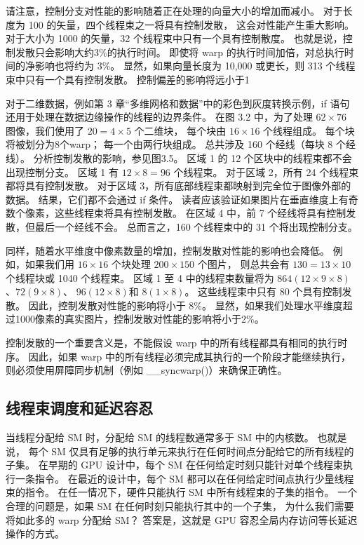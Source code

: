 请注意，控制分支对性能的影响随着正在处理的向量大小的增加而减小。 对于长度为 100 的矢量，四个线程束之一将具有控制发散，
这会对性能产生重大影响。 对于大小为 1000 的矢量，32 个线程束中只有一个具有控制散度。 
也就是说，控制发散只会影响大约3\%的执行时间。 即使将 warp 的执行时间加倍，对总执行时间的净影响也将约为 3\%。 
显然，如果向量长度为 10,000 或更长，则 313 个线程束中只有一个具有控制发散。 控制偏差的影响将远小于1%

对于二维数据，例如第 3 章“多维网格和数据”中的彩色到灰度转换示例，if 语句还用于处理在数据边缘操作的线程的边界条件。 
在图 3.2 中，为了处理 $62 \times 76$ 图像，我们使用了 $20 = 4 \times 5$ 个二维块，
每个块由 $16 \times 16$ 个线程组成。 
每个块将被划分为8个warp； 每一个由两行块组成。 总共涉及 160 个经线（每块 8 个经线）。 分析控制发散的影响，参见图3.5。 
区域 1 的 12 个区块中的线程束都不会出现控制分支。 区域 1 有 $12 \times 8 = 96$ 个线程束。
对于区域 2，所有 24 个线程束都将具有控制发散。 对于区域 3，所有底部线程束都映射到完全位于图像外部的数据。 
结果，它们都不会通过 if 条件。 读者应该验证如果图片在垂直维度上有奇数个像素，这些线程束将具有控制发散。 
在区域 4 中，前 7 个经线将具有控制发散，但最后一个经线不会。 总而言之，160 个线程束中的 31 个将出现控制分支。

同样，随着水平维度中像素数量的增加，控制发散对性能的影响也会降低。 
例如，如果我们用 $16 \times 16$ 个块处理 $200 \times 150$ 个图片，
则总共会有 $130 = 13 \times 10$ 个线程块或 1040 个线程束。 
区域 1 至 4 中的线程束数量将为 $864(12 \times 9 \times 8)$、$72(9 \times 8)$、
$96 (12 \times 8)$和 $8(1 \times 8)$。 
这些线程束中只有 80 个具有控制发散。 因此，控制发散对性能的影响将小于 8\%。 
显然，如果我们处理水平维度超过1000像素的真实图片，控制发散对性能的影响将小于2\%。

控制发散的一个重要含义是，不能假设 warp 中的所有线程都具有相同的执行时序。 
因此，如果 warp 中的所有线程必须完成其执行的一个阶段才能继续执行，
则必须使用屏障同步机制（例如 \_\_syncwarp()）来确保正确性。

\subsection{线程束调度和延迟容忍}
当线程分配给 SM 时，分配给 SM 的线程数通常多于 SM 中的内核数。 也就是说，
每个 SM 仅具有足够的执行单元来执行在任何时间点分配给它的所有线程的子集。 
在早期的 GPU 设计中，每个 SM 在任何给定时刻只能针对单个线程束执行一条指令。 
在最近的设计中，每个 SM 都可以在任何给定时间点执行少量线程束的指令。 
在任一情况下，硬件只能执行 SM 中所有线程束的子集的指令。 一个合理的问题是，如果 SM 在任何时刻只能执行其中的一个子集，
为什么我们需要将如此多的 warp 分配给 SM？ 答案是，这就是 GPU 容忍全局内存访问等长延迟操作的方式。

